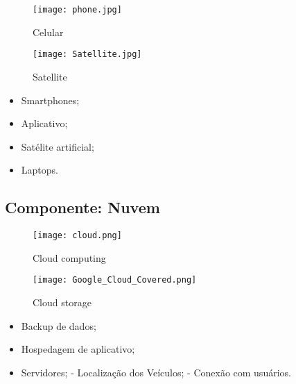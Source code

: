 \begin{figure}[H]
       \begin{center}
              \texttt{[image: phone.jpg]}
              \caption{Celular} \label{sistema}
       \end{center}
\end{figure}

\begin{figure}[H]
       \begin{center}
              \texttt{[image: Satellite.jpg]}
              \caption{Satellite} \label{sistema}
       \end{center}
\end{figure}

\begin{itemize}
       \item Smartphones;
        \item Aplicativo;
        \item Satélite artificial;
        \item Laptops.
        \end{itemize}

\subsection{Componente: Nuvem}

\begin{figure}[H]
       \begin{center}
              \texttt{[image: cloud.png]}
              \caption{Cloud computing} \label{sistema}
       \end{center}
\end{figure}
\begin{figure}[H]
       \begin{center}
              \texttt{[image: Google\_Cloud\_Covered.png]}
              \caption{Cloud storage} \label{sistema}
       \end{center}
\end{figure}

\begin{itemize}
       \item Backup de dados;
       \item Hospedagem de aplicativo;
       \item Servidores;
        \subitem - Localização dos Veículos;
        \subitem - Conexão com usuários.

      \end{itemize}
